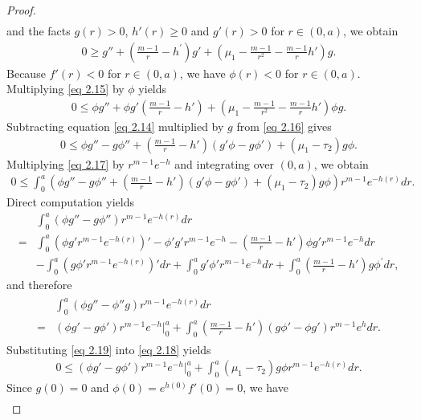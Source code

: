 \documentclass[10pt,a4paper]{amsart}
\begin{document}
\begin{proof}
\begin{align*}
\end{align*}
and the facts $g(r)>0$,  $h'(r)\ge 0$ and $g'(r)>0$ for $r\in (0,a)$, we obtain
\begin{align}\label{eq 2.15}
    0\geq  g''+(\frac{m-1}{r}-h^{'})g'+(\mu_{1}-\frac{m-1}{r^{2}}-\frac{m-1}{r}h') g.
\end{align}
Because $f'(r)<0$ for $r\in (0,a)$, we have $\phi(r)<0$ for $r\in(0, a)$. Multiplying \eqref{eq 2.15} by $\phi$  yields
\begin{align}\label{eq 2.16}
    0\leq \phi g''+\phi g'(\frac{m-1}{r}-h')+(\mu_{1}-\frac{m-1}{r^{2}}-\frac{m-1}{r}h') \phi g.
\end{align}
Subtracting equation \eqref{eq 2.14} multiplied by  $g$
from \eqref{eq 2.16} gives
\begin{align}\label{eq 2.17}
    0\leq \phi g''-g\phi''+(\frac{m-1}{r}-h')(g'\phi-g\phi')+(\mu_{1}-\tau_{2})g\phi.
\end{align}
Multiplying \eqref{eq 2.17} by $r^{m-1}e^{-h}$ and integrating over $(0,a)$, we obtain
\begin{align}\label{eq 2.18}
    0\leq \int_{0}^{a}(\phi g''-g\phi''+(\frac{m-1}{r}-h')(g'\phi-g\phi')+(\mu_{1}-\tau_{2})g\phi)r^{m-1}e^{-h(r)}dr.
\end{align}
Direct computation yields
\begin{align*}
   & \int_{0}^{a}(\phi g''-g\phi'')r^{m-1}e^{-h(r)}dr\\
    =&\int_{0}^{a}(\phi g'r^{m-1}e^{-h(r)})'-\phi'g'r^{m-1}e^{-h}-(\frac{m-1}{r}-h')\phi g'r^{m-1}e^{-h}dr\\
    &-\int_{0}^{a}(g\phi'r^{m-1}e^{-h(r)})'dr+\int_{0}^{a}g'\phi'r^{m-1}e^{-h}dr+\int_{0}^{a}(\frac{m-1}{r}-h')g\phi^{'}dr,
\end{align*}
and therefore
\begin{align}\label{eq 2.19}
\begin{split}
       &\int_{0}^{a}(\phi g''-\phi''g)r^{m-1}e^{-h(r)}dr\\
    =&(\phi g'-g\phi')r^{m-1}e^{-h}\Big|_{0}^{a}+\int_{0}^{a}(\frac{m-1}{r}-h')(g\phi'-\phi g')r^{m-1}e^{h}dr. 
\end{split}
\end{align}
Substituting \eqref{eq 2.19} into  \eqref{eq 2.18} yields 
\begin{align}\label{eq 2.20}
    0\leq (\phi g'-g\phi')r^{m-1}e^{-h}\Big|_{0}^{a}+\int_{0}^{a}(\mu_{1}-\tau_{2})g\phi r^{m-1}e^{-h(r)}dr.
\end{align}
Since $g(0)=0$ and $\phi(0)=e^{h(0)}f'(0)=0$, we have 
\begin{align*}

\end{align*}
\end{proof}
\end{document}
